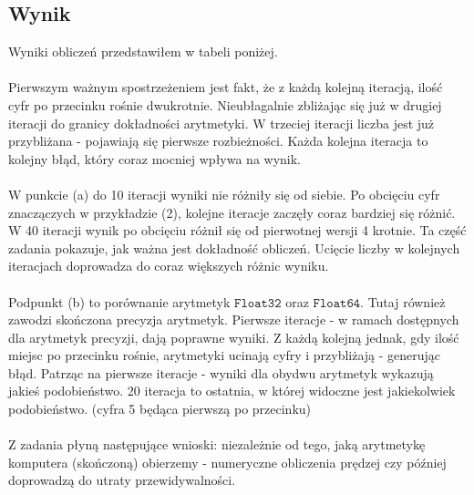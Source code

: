 \subsection{Wynik}
Wyniki obliczeń przedstawiłem w tabeli poniżej. \\\\
Pierwszym ważnym spostrzeżeniem jest fakt, że z każdą kolejną iteracją, ilość cyfr po przecinku rośnie dwukrotnie. Nieubłagalnie zbliżając się już w drugiej iteracji do granicy dokładności arytmetyki. W trzeciej iteracji liczba jest już przybliżana - pojawiają się pierwsze rozbieżności. Każda kolejna iteracja to kolejny błąd, który coraz mocniej wpływa na wynik. \\\\
W punkcie (a) do 10 iteracji wyniki nie różniły się od siebie. Po obcięciu cyfr znaczączych w przykładzie (2), kolejne iteracje zaczęły coraz bardziej się różnić. W 40 iteracji wynik po obcięciu różnił się od pierwotnej wersji 4 krotnie. Ta część zadania pokazuje, jak ważna jest dokładność obliczeń. Ucięcie liczby w kolejnych iteracjach doprowadza do coraz większych różnic wyniku. \\\\
Podpunkt (b) to porównanie arytmetyk $ \mathtt{Float32} $ oraz $ \mathtt{Float64} $. Tutaj również zawodzi skończona precyzja arytmetyk. Pierwsze iteracje - w ramach dostępnych dla arytmetyk precyzji, dają poprawne wyniki. Z każdą kolejną jednak, gdy ilość miejsc po przecinku rośnie, arytmetyki ucinają cyfry i przybliżają - generując błąd. Patrząc na pierwsze iteracje - wyniki dla obydwu arytmetyk wykazują jakieś podobieństwo. 20 iteracja to ostatnia, w której widoczne jest jakiekolwiek podobieństwo. (cyfra 5 będąca pierwszą po przecinku) \\\\
Z zadania płyną następujące wnioski: niezależnie od tego, jaką arytmetykę komputera (skończoną) obierzemy - numeryczne obliczenia prędzej czy później doprowadzą do utraty przewidywalności.

\begin{center}
    
\end{center}